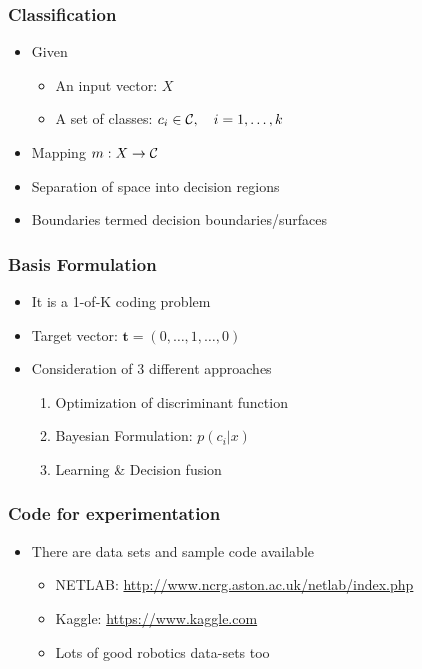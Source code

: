 \documentclass[10pt]{beamer}
\begin{document}
\begin{frame}
  \frametitle{Classification}
  \begin{itemize}
  \item Given 
    \begin{itemize}
    \item An input vector: $X$
    \item A set of classes: $c_i \in {\cal C}, \quad i=1, \ldots, k$
    \end{itemize}
  \item Mapping $m: X \rightarrow {\cal C}$
  \item Separation of space into decision regions
  \item Boundaries termed decision boundaries/surfaces
  \end{itemize}
\end{frame}

\begin{frame}
  \frametitle{Basis Formulation}
  \begin{itemize}
  \item It is a 1-of-K coding problem
  \item Target vector: ${\mathbf t} =\left( 0, \ldots, 1, \ldots, 0
    \right)$
  \item Consideration of 3 different approaches
    \begin{enumerate}
    \item Optimization of discriminant function
    \item Bayesian Formulation: $p(c_i | x)$
    \item Learning \& Decision fusion
    \end{enumerate}
  \end{itemize}
\end{frame}

\begin{frame}
  \frametitle{Code for experimentation}
  \begin{itemize}
  \item There are data sets and sample code available
    \begin{itemize}
    \item NETLAB: \url{http://www.ncrg.aston.ac.uk/netlab/index.php}
    \item Kaggle: \url{https://www.kaggle.com}
    \item Lots of good robotics data-sets too
    \end{itemize}
  \end{itemize}
\end{frame}
\end{document}
